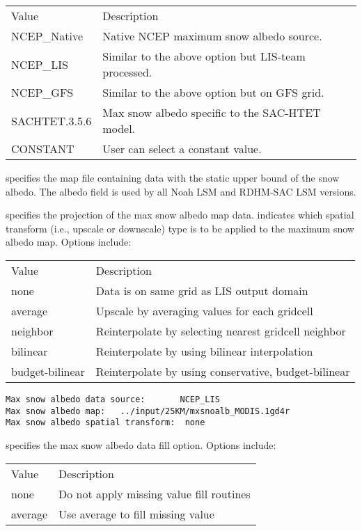  \begin{tabular}{ll}
 Value         & Description    \\
 NCEP\_Native  &  Native NCEP maximum snow albedo source. \\
 NCEP\_LIS     &  Similar to the above option but LIS-team processed. \\
 NCEP\_GFS     &  Similar to the above option but on GFS grid. \\
 SACHTET.3.5.6 &  Max snow albedo specific to the SAC-HTET model. \\
 CONSTANT      &  User can select a constant value. \\
 \end{tabular}

  specifies the map file containing
 data with the static upper bound of the snow albedo.
  The albedo field is used by all Noah LSM and RDHM-SAC LSM versions.

  specifies the projection of the
 max snow albedo map data.
  indicates which spatial
 transform (i.e., upscale or downscale) type is to be applied
 to the maximum snow albedo map.  Options include:

 \begin{tabular}{ll}
 Value    & Description                                             \\
 none      & Data is on same grid as LIS output domain              \\
 average   & Upscale by averaging values for each gridcell          \\
 neighbor  & Reinterpolate by selecting nearest gridcell neighbor   \\
 bilinear  & Reinterpolate by using bilinear interpolation          \\
 budget-bilinear & Reinterpolate by using conservative, budget-bilinear \\
 \end{tabular}
 

 \begin{Verbatim}[frame=single]
Max snow albedo data source:       NCEP_LIS
Max snow albedo map:   ../input/25KM/mxsnoalb_MODIS.1gd4r
Max snow albedo spatial transform:  none
 \end{Verbatim}

 
  specifies the max snow albedo
 data fill option.  Options include:

 \begin{tabular}{ll}
 Value   & Description                               \\
 none    &  Do not apply missing value fill routines \\
 average &  Use average to fill missing value        \\
 \end{tabular}

